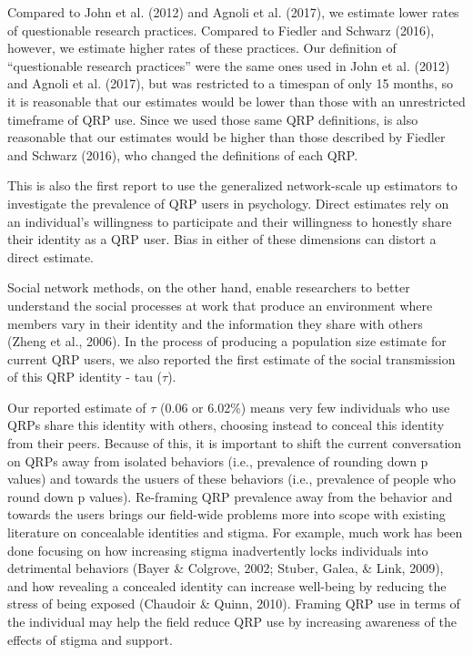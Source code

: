\documentclass[jou]{apa6}
\theoremstyle{definition}
\theoremstyle{definition}
\theoremstyle{definition}
\theoremstyle{remark}
\begin{document}
Compared to John et al. (2012) and Agnoli et al. (2017), we estimate
lower rates of questionable research practices. Compared to Fiedler and
Schwarz (2016), however, we estimate higher rates of these practices.
Our definition of \enquote{questionable research practices} were the
same ones used in John et al. (2012) and Agnoli et al. (2017), but was
restricted to a timespan of only 15 months, so it is reasonable that our
estimates would be lower than those with an unrestricted timeframe of
QRP use. Since we used those same QRP definitions, is also reasonable
that our estimates would be higher than those described by Fiedler and
Schwarz (2016), who changed the definitions of each QRP.

This is also the first report to use the generalized network-scale up
estimators to investigate the prevalence of QRP users in psychology.
Direct estimates rely on an individual's willingness to participate and
their willingness to honestly share their identity as a QRP user. Bias
in either of these dimensions can distort a direct estimate.

Social network methods, on the other hand, enable researchers to better
understand the social processes at work that produce an environment
where members vary in their identity and the information they share with
others (Zheng et al., 2006). In the process of producing a population
size estimate for current QRP users, we also reported the first estimate
of the social transmission of this QRP identity - tau (\(\tau\)).

Our reported estimate of \(\tau\) (0.06 or 6.02\%) means very few
individuals who use QRPs share this identity with others, choosing
instead to conceal this identity from their peers. Because of this, it
is important to shift the current conversation on QRPs away from
isolated behaviors (i.e., prevalence of rounding down p values) and
towards the usuers of these behaviors (i.e., prevalence of people who
round down p values). Re-framing QRP prevalence away from the behavior
and towards the users brings our field-wide problems more into scope
with existing literature on concealable identities and stigma. For
example, much work has been done focusing on how increasing stigma
inadvertently locks individuals into detrimental behaviors (Bayer \&
Colgrove, 2002; Stuber, Galea, \& Link, 2009), and how revealing a
concealed identity can increase well-being by reducing the stress of
being exposed (Chaudoir \& Quinn, 2010). Framing QRP use in terms of the
individual may help the field reduce QRP use by increasing awareness of
the effects of stigma and support.
\end{document}
